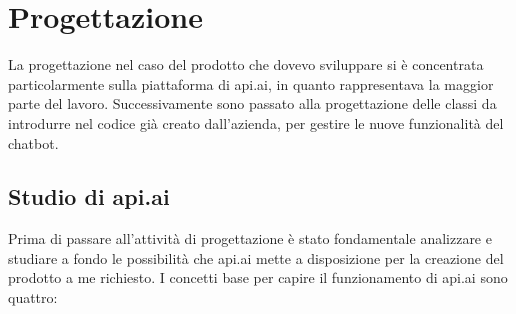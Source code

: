
\chapter{Progettazione}
\label{cap:progettazione}

La progettazione nel caso del prodotto che dovevo sviluppare si è concentrata particolarmente sulla piattaforma di api.ai, in quanto rappresentava la maggior parte del lavoro. Successivamente sono passato alla progettazione delle classi da introdurre nel codice già creato dall'azienda, per gestire le nuove funzionalità del \gls{chatbot}.

\section{Studio di api.ai}
Prima di passare all'attività di progettazione è stato fondamentale analizzare e studiare a fondo le possibilità che api.ai mette a disposizione per la creazione del prodotto a me richiesto. I concetti base per capire il funzionamento di api.ai sono quattro:
